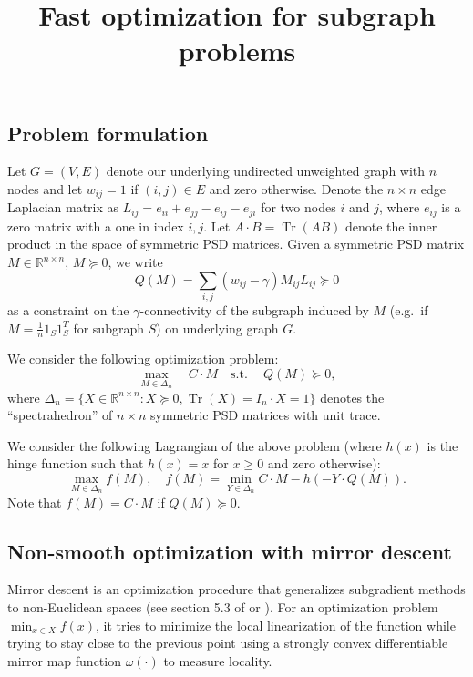\documentclass{article}
\DeclareMathOperator{\Tr}{Tr}
\begin{document}
\title{Fast optimization for subgraph problems}
\author{\vspace{-10pt}}

\maketitle

\subsection*{Problem formulation}

Let $G = (V,E)$ denote our underlying undirected unweighted graph with $n$ nodes and let $w_{ij} = 1$ if $(i,j) \in E$ and zero otherwise. Denote the $n \times n$ edge Laplacian matrix as $L_{ij} = e_{ii} + e_{jj} - e_{ij} - e_{ji}$ for two nodes $i$ and $j$, where $e_{ij}$ is a zero matrix with a one in index $i,j$. Let $A \cdot B = \Tr(A B)$ denote the inner product in the space of symmetric PSD matrices. Given a symmetric PSD matrix $M \in \mathbb{R}^{n \times n}$, $M \succeq 0$, we write
\[ Q(M) = \sum_{i,j} (w_{ij} - \gamma) M_{ij} L_{ij} \succeq 0 \]
as a constraint on the $\gamma$-connectivity of the subgraph induced by $M$ (e.g.\ if $M = \frac{1}{n} 1_S 1_S^T$ for subgraph $S$) on underlying graph $G$.

We consider the following optimization problem:
\begin{equation}\label{eq:opt}
  \max_{M \in \Delta_n} \quad C \cdot M \quad \mathrm{s.t.\ } \quad Q(M) \succeq 0,
\end{equation}
where $\Delta_n = \{X \in \mathbb{R}^{n \times n} : X \succeq 0, \Tr(X) = I_n \cdot X = 1 \}$ denotes the ``spectrahedron'' of $n \times n$ symmetric PSD matrices with unit trace. 

We consider the following Lagrangian of the above problem (where $h(x)$ is the hinge function such that $h(x) = x$ for $x \geq 0$ and zero otherwise):
\begin{equation}\label{eq:opt2}
  \max_{M \in \Delta_n} f(M),\quad f(M) = \min_{Y \in \Delta_n} C \cdot M - h(- Y \cdot Q(M)).
\end{equation}
Note that $f(M) = C \cdot M$ if $Q(M) \succeq 0$.


\subsection*{Non-smooth optimization with mirror descent}

Mirror descent is an optimization procedure that generalizes subgradient methods to non-Euclidean spaces (see section 5.3 of \cite{lectures} or \cite{blog}). For an optimization problem $\min_{x \in X} f(x)$, it tries to minimize the local linearization of the function while trying to stay close to the previous point using a strongly convex differentiable mirror map function $\omega(\cdot)$ to measure locality.
\end{document}
